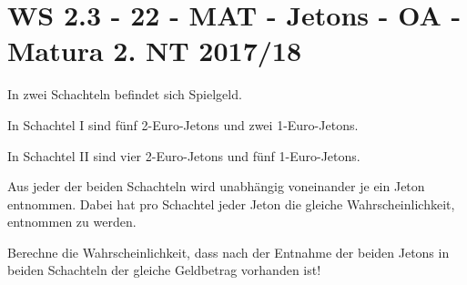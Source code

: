 \section{WS 2.3 - 22 - MAT - Jetons - OA - Matura 2. NT 2017/18}

\begin{beispiel}[WS 2.3]{1}
In zwei Schachteln befindet sich Spielgeld.

In Schachtel I sind fünf 2-Euro-Jetons und zwei 1-Euro-Jetons.

In Schachtel II sind vier 2-Euro-Jetons und fünf 1-Euro-Jetons.

Aus jeder der beiden Schachteln wird unabhängig voneinander je ein Jeton entnommen. Dabei
hat pro Schachtel jeder Jeton die gleiche Wahrscheinlichkeit, entnommen zu werden.

Berechne die Wahrscheinlichkeit, dass nach der Entnahme der beiden Jetons in beiden
Schachteln der gleiche Geldbetrag vorhanden ist!

\end{beispiel}